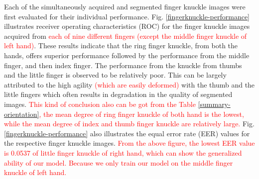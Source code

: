 Each of the simultaneously acquired and segmented finger knuckle images were first evaluated for their individual performance. Fig. \ref{fingerknuckle-performance} illustrates receiver operating characteristics (ROC) for the finger knuckle images acquired from \textcolor{red}{each of nine different fingers (except the middle finger knuckle of left hand)}. These results indicate that the ring finger knuckle, from both the hands, offers superior performance followed by the performance from the middle finger, and then index finger. The performance from the knuckle from thumbs and the little finger is observed to be relatively poor. This can be largely attributed to the high agility \textcolor{red}{(which are easily deformed)} with the thumb and the little fingers which often results in degradation in the quality of segmented images. \textcolor{red}{This kind of conclusion also can be got from the Table \ref{summary-orientation}, the mean degree of ring finger knuckle of both hand is the lowest, while the mean degree of index and thumb finger knuckle are relatively large.} Fig. \ref{fingerknuckle-performance} also illustrates the equal error rate (EER) values for the respective finger knuckle images. \textcolor{red}{From the above figure, the lowest EER value is 0.0537 of little finger knuckle of right hand, which can show the generalized ability of our model. Because we only train our model on the middle finger knuckle of left hand.}

